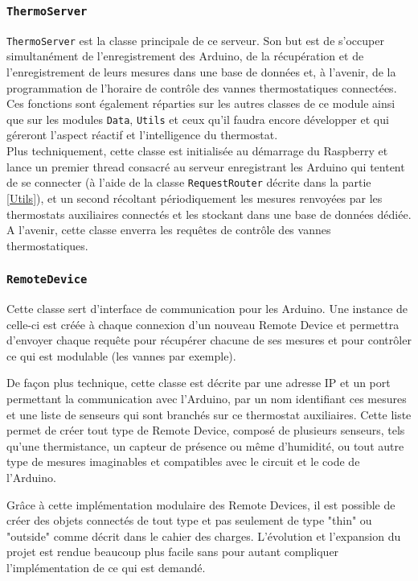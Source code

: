 \documentclass[11pt,a4paper,11pt]{report}
\begin{document}
\subsubsection{\texttt{ThermoServer}}
\texttt{ThermoServer} est la classe principale de ce serveur. Son but est de s'occuper simultanément de l'enregistrement des Arduino, de la récupération et de l'enregistrement de leurs mesures dans une base de données et, à l'avenir, de la programmation de l'horaire de contrôle des vannes thermostatiques connectées. Ces fonctions sont également réparties sur les autres classes de ce module ainsi que sur les modules \texttt{Data}, \texttt{Utils} et ceux qu'il faudra encore développer et qui géreront l'aspect réactif et l'intelligence du thermostat.\\


Plus techniquement, cette classe est initialisée au démarrage du Raspberry et lance un premier thread consacré au serveur enregistrant les Arduino qui tentent de se connecter (à l'aide de la classe \texttt{RequestRouter} décrite dans la partie \ref{Utils}), et un second récoltant périodiquement les mesures renvoyées par les thermostats auxiliaires connectés et les stockant dans une base de données dédiée. A l'avenir, cette classe enverra les requêtes de contrôle des vannes thermostatiques.


\subsubsection{\texttt{RemoteDevice}}

Cette classe sert d'interface de communication pour les Arduino. Une instance de celle-ci est créée à chaque connexion d'un nouveau Remote Device et permettra d'envoyer chaque requête pour récupérer chacune de ses mesures et pour contrôler ce qui est modulable (les vannes par exemple).

De façon plus technique, cette classe est décrite par une adresse IP et un port permettant la communication avec l'Arduino, par un nom identifiant ces mesures et une liste de senseurs qui sont branchés sur ce thermostat auxiliaires. Cette liste permet de créer tout type de Remote Device, composé de plusieurs senseurs, tels qu'une thermistance, un capteur de présence ou même d'humidité, ou tout autre type de mesures imaginables et compatibles avec le circuit et le code de l'Arduino. 

Grâce à cette implémentation modulaire des Remote Devices, il est possible de créer des objets connectés de tout type et pas seulement de type "thin" ou "outside" comme décrit dans le cahier des charges. L’évolution et l'expansion du projet est rendue beaucoup plus facile sans pour autant compliquer l'implémentation de ce qui est demandé.
\end{document}
